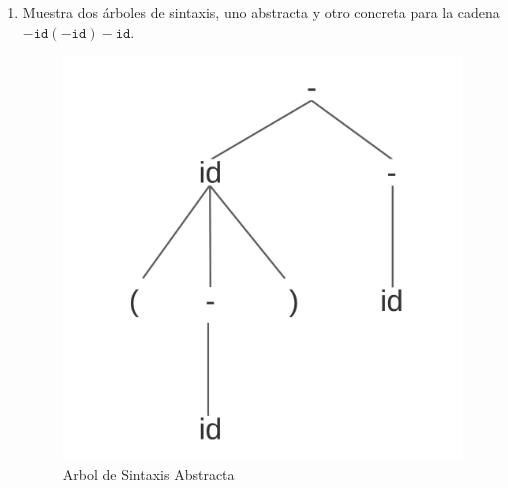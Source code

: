 \begin{enumerate}
    \item Muestra dos \'arboles de sintaxis, uno abstracta y otro
    concreta para la cadena
    $-\mathtt{id}(-\mathtt{id})-\mathtt{id}$.

        \begin{figure}[h]
            \centering
            \includegraphics[scale = 0.5]{../Imagen/abst}
            \caption{Arbol de Sintaxis Abstracta}
            \label{fig:abst}
        \end{figure}


\end{enumerate}